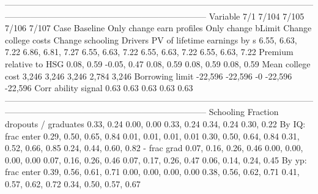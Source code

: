 -----------------------------------------------------------------------------------------------------------------------------------------------------------------------------------
                              Variable                          7/1                        7/104                    7/105                        7/106                        7/107
                                  Case                     Baseline    Only change earn profiles       Only change bLimit         Change college costs             Change schooling
                               Drivers                                                                                                                                             
          PV of lifetime earnings by s             6.55, 6.63, 7.22             6.86, 6.81, 7.27         6.55, 6.63, 7.22             6.55, 6.63, 7.22             6.55, 6.63, 7.22
               Premium relative to HSG                   0.08, 0.59                  -0.05, 0.47               0.08, 0.59                   0.08, 0.59                   0.08, 0.59
                     Mean college cost                        3,246                        3,246                    3,246                        2,784                        3,246
                       Borrowing limit                      -22,596                      -22,596                       -0                      -22,596                      -22,596
                   Corr ability signal                         0.63                         0.63                     0.63                         0.63                         0.63
-----------------------------------------------------------------------------------------------------------------------------------------------------------------------------------
                             Schooling                                                                                                                                             
         Fraction dropouts / graduates                   0.33, 0.24                   0.00, 0.00               0.33, 0.24                   0.34, 0.24                   0.30, 0.22
                     By IQ: frac enter       0.29, 0.50, 0.65, 0.84       0.01, 0.01, 0.01, 0.01   0.30, 0.50, 0.64, 0.84       0.31, 0.52, 0.66, 0.85       0.24, 0.44, 0.60, 0.82
                           - frac grad       0.07, 0.16, 0.26, 0.46       0.00, 0.00, 0.00, 0.00   0.07, 0.16, 0.26, 0.46       0.07, 0.17, 0.26, 0.47       0.06, 0.14, 0.24, 0.45
                     By yp: frac enter       0.39, 0.56, 0.61, 0.71       0.00, 0.00, 0.00, 0.00   0.38, 0.56, 0.62, 0.71       0.41, 0.57, 0.62, 0.72       0.34, 0.50, 0.57, 0.67
